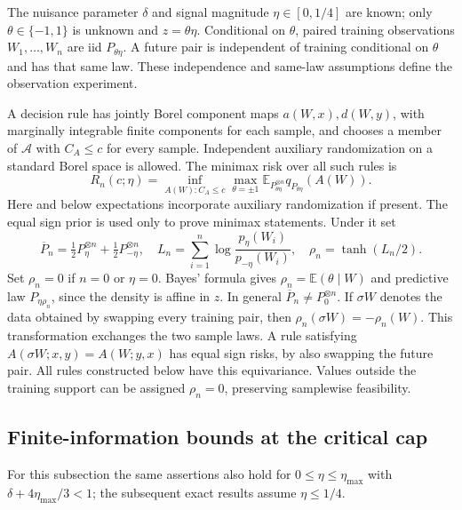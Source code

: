 \documentclass[11pt,a4paper]{amsart}
\theoremstyle{plain}
\theoremstyle{definition}
\theoremstyle{remark}
\newcommand{\EE}{\mathbb{E}}
\newcommand{\calA}{\mathcal{A}}
\begin{document}
The nuisance parameter $\delta$ and signal magnitude $\eta\in[0,1/4]$ are known; only $\theta\in\{-1,1\}$ is unknown and $z=\theta\eta$. Conditional on $\theta$, paired training observations $W_1,\ldots,W_n$ are iid $P_{\theta\eta}$. A future pair is independent of training conditional on $\theta$ and has that same law. These independence and same-law assumptions define the observation experiment.

A decision rule has jointly Borel component maps $a(W,x),d(W,y)$, with marginally integrable finite components for each sample, and chooses a member of $\calA$ with $C_A\le c$ for every sample. Independent auxiliary randomization on a standard Borel space is allowed. The minimax risk over all such rules is
\begin{equation}\label{eq:statisticalrisk}
 R_n(c;\eta)=\inf_{A(W):C_A\le c}\max_{\theta=\pm1}
 \EE_{P_{\theta\eta}^{\otimes n}}q_{P_{\theta\eta}}(A(W)).
\end{equation}
Here and below expectations incorporate auxiliary randomization if present. The equal sign prior is used only to prove minimax statements. Under it set
\begin{equation}\label{eq:posterior}
 \overline P_n=\tfrac12P_\eta^{\otimes n}+\tfrac12P_{-\eta}^{\otimes n},\quad
 L_n=\sum_{i=1}^n\log\frac{p_\eta(W_i)}{p_{-\eta}(W_i)},\quad
 \rho_n=\tanh(L_n/2).
\end{equation}
Set $\rho_n=0$ if $n=0$ or $\eta=0$. Bayes' formula gives $\rho_n=\EE(\theta\mid W)$ and predictive law $P_{\eta\rho_n}$, since the density is affine in $z$. In general $\overline P_n\ne P_0^{\otimes n}$. If $\sigma W$ denotes the data obtained by swapping every training pair, then $\rho_n(\sigma W)=-\rho_n(W)$. This transformation exchanges the two sample laws. A rule satisfying $A(\sigma W;x,y)=A(W;y,x)$ has equal sign risks, by also swapping the future pair. All rules constructed below have this equivariance. Values outside the training support can be assigned $\rho_n=0$, preserving samplewise feasibility.

\subsection{Finite-information bounds at the critical cap}
For this subsection the same assertions also hold for $0\le\eta\le\eta_{\max}$ with $\delta+4\eta_{\max}/3<1$; the subsequent exact results assume $\eta\le1/4$.
\end{document}
